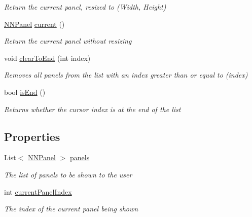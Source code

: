 \begin{DoxyCompactItemize}
\begin{DoxyCompactList}\small\item\em Return the current panel, resized to (Width, Height) \end{DoxyCompactList}\item 
\hyperlink{class_n_n_gen_1_1_n_n_panel}{N\+N\+Panel} \hyperlink{class_n_n_gen_1_1_panel_container_abb4eb5b543b584a98049316c23f20c8e}{current} ()
\begin{DoxyCompactList}\small\item\em Return the current panel without resizing \end{DoxyCompactList}\item 
void \hyperlink{class_n_n_gen_1_1_panel_container_a38332e7d9ea9d92eff375cf40a6458a4}{clear\+To\+End} (int index)
\begin{DoxyCompactList}\small\item\em Removes all panels from the list with an index greater than or equal to (index) \end{DoxyCompactList}\item 
bool \hyperlink{class_n_n_gen_1_1_panel_container_a181928c6c73958241a1db08f21cd1257}{is\+End} ()
\begin{DoxyCompactList}\small\item\em Returns whether the cursor index is at the end of the list \end{DoxyCompactList}\end{DoxyCompactItemize}
\subsection*{Properties}
\begin{DoxyCompactItemize}
\item 
List$<$ \hyperlink{class_n_n_gen_1_1_n_n_panel}{N\+N\+Panel} $>$ \hyperlink{class_n_n_gen_1_1_panel_container_a31f3e003f5a5fa87884d717e2c01f310}{panels}
\begin{DoxyCompactList}\small\item\em The list of panels to be shown to the user \end{DoxyCompactList}\item 
int \hyperlink{class_n_n_gen_1_1_panel_container_a2134090074da8e94c15b7ed69fe75d06}{current\+Panel\+Index}
\begin{DoxyCompactList}\small\item\em The index of the current panel being shown \end{DoxyCompactList}\end{DoxyCompactItemize}


